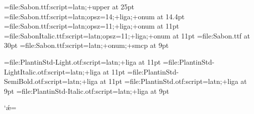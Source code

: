 
\font\displayfont=file:Sabon.ttf:script=latn;+upper at 25pt
\font\headerfont=file:Sabon.ttf:script=latn;opsz=14;+liga;+onum at 14.4pt
\font\decorativfont=file:Sabon.ttf:script=latn;opsz=11;+liga;+onum at 11pt
\font\itdecorativfont=file:SabonItalic.ttf:script=latn;opsz=11;+liga;+onum at 11pt
\font{}=file:Sabon.ttf at 30pt
\font\scshapefont=file:Sabon.ttf:script=latn;+onum;+smcp at 9pt

\font\regularfont=file:PlantinStd-Light.otf:script=latn;+liga at 11pt
\font\italicfont=file:PlantinStd-LightItalic.otf:script=latn;+liga at 11pt
\font\boldfont=file:PlantinStd-SemiBold.otf:script=latn;+liga at 11pt
\font\frfont=file:PlantinStd.otf:script=latn;+liga at 9pt
\font\rubricfont=file:PlantinStd-Italic.otf:script=latn;+liga at 9pt

\catcode`ǽ=\active
{}

\newif\ifplantin

\def\display{\plantinfalse\displayfont}
\def\header{\plantinfalse\headerfont}
\def\decorativ{\plantinfalse\decorativfont
\def\it{\itdecorativfont}
\def\rm{\decorativfont}}

\def\regular{\plantintrue\regularfont
\def\it{\italicfont}
\def\rm{\regularfont}
\def\bf{\boldfont}}

\def\small{\plantintrue\frfont
\def\it{\rubricfont}
\def\rm{\frfont}
\def\sc{\scshapefont}}
